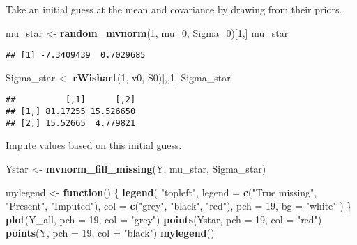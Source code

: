 \documentclass[]{article}
\newenvironment{Shaded}{\begin{snugshade}}{\end{snugshade}}
\newcommand{\ControlFlowTok}[1]{\textcolor[rgb]{0.13,0.29,0.53}{\textbf{#1}}}
\newcommand{\DataTypeTok}[1]{\textcolor[rgb]{0.13,0.29,0.53}{#1}}
\newcommand{\DecValTok}[1]{\textcolor[rgb]{0.00,0.00,0.81}{#1}}
\newcommand{\KeywordTok}[1]{\textcolor[rgb]{0.13,0.29,0.53}{\textbf{#1}}}
\newcommand{\NormalTok}[1]{#1}
\newcommand{\StringTok}[1]{\textcolor[rgb]{0.31,0.60,0.02}{#1}}
\begin{document}
Take an initial guess at the mean and covariance by drawing from their
priors.

\begin{Shaded}
\begin{Highlighting}[]
\NormalTok{mu_star <-}\StringTok{ }\KeywordTok{random_mvnorm}\NormalTok{(}\DecValTok{1}\NormalTok{, mu_}\DecValTok{0}\NormalTok{, Sigma_}\DecValTok{0}\NormalTok{)[}\DecValTok{1}\NormalTok{,]}
\NormalTok{mu_star}
\end{Highlighting}
\end{Shaded}

\begin{verbatim}
## [1] -7.3409439  0.7029685
\end{verbatim}

\begin{Shaded}
\begin{Highlighting}[]
\NormalTok{Sigma_star <-}\StringTok{ }\KeywordTok{rWishart}\NormalTok{(}\DecValTok{1}\NormalTok{, v0, S0)[,,}\DecValTok{1}\NormalTok{]}
\NormalTok{Sigma_star}
\end{Highlighting}
\end{Shaded}

\begin{verbatim}
##          [,1]      [,2]
## [1,] 81.17255 15.526650
## [2,] 15.52665  4.779821
\end{verbatim}

Impute values based on this initial guess.

\begin{Shaded}
\begin{Highlighting}[]
\NormalTok{Ystar <-}\StringTok{ }\KeywordTok{mvnorm_fill_missing}\NormalTok{(Y, mu_star, Sigma_star)}

\NormalTok{mylegend <-}\StringTok{ }\ControlFlowTok{function}\NormalTok{() \{}
  \KeywordTok{legend}\NormalTok{(}
    \StringTok{"topleft"}\NormalTok{,}
    \DataTypeTok{legend =} \KeywordTok{c}\NormalTok{(}\StringTok{"True missing"}\NormalTok{, }\StringTok{"Present"}\NormalTok{, }\StringTok{"Imputed"}\NormalTok{),}
    \DataTypeTok{col =} \KeywordTok{c}\NormalTok{(}\StringTok{"grey"}\NormalTok{, }\StringTok{"black"}\NormalTok{, }\StringTok{"red"}\NormalTok{),}
    \DataTypeTok{pch =} \DecValTok{19}\NormalTok{,}
    \DataTypeTok{bg =} \StringTok{"white"}
\NormalTok{  )}
\NormalTok{\}}
\KeywordTok{plot}\NormalTok{(Y_all, }\DataTypeTok{pch =} \DecValTok{19}\NormalTok{, }\DataTypeTok{col =} \StringTok{"grey"}\NormalTok{)}
\KeywordTok{points}\NormalTok{(Ystar, }\DataTypeTok{pch =} \DecValTok{19}\NormalTok{, }\DataTypeTok{col =} \StringTok{"red"}\NormalTok{)}
\KeywordTok{points}\NormalTok{(Y, }\DataTypeTok{pch =} \DecValTok{19}\NormalTok{, }\DataTypeTok{col =} \StringTok{"black"}\NormalTok{)}
\KeywordTok{mylegend}\NormalTok{()}
\end{Highlighting}
\end{Shaded}
\end{document}
